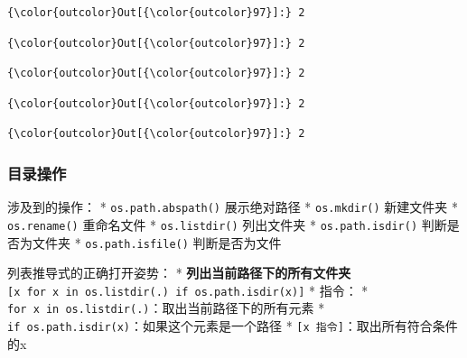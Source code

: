 \documentclass[11pt]{article}
\begin{document}
\begin{Verbatim}[commandchars=\\\{\}]
{\color{outcolor}Out[{\color{outcolor}97}]:} 2
\end{Verbatim}
            
\begin{Verbatim}[commandchars=\\\{\}]
{\color{outcolor}Out[{\color{outcolor}97}]:} 2
\end{Verbatim}
            
\begin{Verbatim}[commandchars=\\\{\}]
{\color{outcolor}Out[{\color{outcolor}97}]:} 2
\end{Verbatim}
            
\begin{Verbatim}[commandchars=\\\{\}]
{\color{outcolor}Out[{\color{outcolor}97}]:} 2
\end{Verbatim}
            
\begin{Verbatim}[commandchars=\\\{\}]
{\color{outcolor}Out[{\color{outcolor}97}]:} 2
\end{Verbatim}
            
    \subsubsection{目录操作}\label{ux76eeux5f55ux64cdux4f5c}

涉及到的操作： * \texttt{os.path.abspath()} 展示绝对路径 *
\texttt{os.mkdir()} 新建文件夹 * \texttt{os.rename()} 重命名文件 *
\texttt{os.listdir()} 列出文件夹 * \texttt{os.path.isdir()}
判断是否为文件夹 * \texttt{os.path.isfile()} 判断是否为文件

列表推导式的正确打开姿势： * \textbf{列出当前路径下的所有文件夹}\\
\texttt{{[}x\ for\ x\ in\ os.listdir(\textquotesingle{}.\textquotesingle{})\ if\ os.path.isdir(x){]}}
* 指令： *
\texttt{for\ x\ in\ os.listdir(\textquotesingle{}.\textquotesingle{})}：取出当前路径下的所有元素
* \texttt{if\ os.path.isdir(x)}：如果这个元素是一个路径 *
\texttt{{[}x\ 指令{]}}：取出所有符合条件的x
\end{document}
